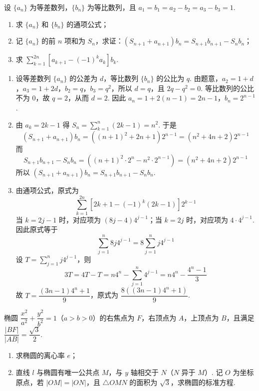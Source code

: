 \begin{problem}
设 \(\{a_n\}\) 为等差数列，\(\{b_n\}\) 为等比数列，且 \(a_1=b_1=a_2-b_2=a_3-b_3=1\).

\begin{enumerate}
\item 求 \(\{a_n\}\) 和 \(\{b_n\}\) 的通项公式；
\item 记 \(\{a_n\}\) 的前 \(n\) 项和为 \(S_n\)，求证：\(\left(S_{n+1}+a_{n+1}\right)b_n=S_{n+1}b_{n+1}-S_nb_n\)；
\item 求 \(\displaystyle\sum_{k=1}^{2n}\left[a_{k+1}-(-1)^ka_k\right]b_k\).
\end{enumerate}
\end{problem}

\begin{solution}
\begin{enumerate}
\item 设等差数列 \(\{a_n\}\) 的公差为 \(d\)，等比数列 \(\{b_n\}\) 的公比为 \(q\). 由题意，\(a_2=1+d\)，\(a_3=1+2d\)，\(b_2=q\)，\(b_3=q^2\)，所以 \(d=q\)，且 \(2q-q^2=0\). 等比数列的公比不为 \(0\)，故 \(q=2\)，从而 \(d=2\). 因此 \(a_n=1+2(n-1)=2n-1\)，\(b_n=2^{n-1}\).
\item 由 \(a_k=2k-1\) 得 \(S_n=\sum_{k=1}^n(2k-1)=n^2\). 于是
\[
(S_{n+1}+a_{n+1})b_n=((n+1)^2+2n+1)2^{n-1}=(n^2+4n+2)2^{n-1}
\]
而
\[
S_{n+1}b_{n+1}-S_nb_n=((n+1)^2\cdot2^n-n^2\cdot2^{n-1})=(n^2+4n+2)2^{n-1}
\]
所以 \((S_{n+1}+a_{n+1})b_n=S_{n+1}b_{n+1}-S_nb_n\).
\item 由通项公式，原式为
\[
\sum_{k=1}^{2n}\left[2k+1-(-1)^k(2k-1)\right]2^{k-1}
\]
当 \(k=2j-1\) 时，对应项为 \((8j-4)4^{j-1}\)；当 \(k=2j\) 时，对应项为 \(4\cdot4^{j-1}\). 因此原式等于
\[
\sum_{j=1}^n8j4^{j-1}=8\sum_{j=1}^n j4^{j-1}
\]
设 \(T=\sum_{j=1}^n j4^{j-1}\)，则
\[
3T=4T-T=n4^n-\sum_{j=1}^n4^{j-1}=n4^n-\dfrac{4^n-1}{3}
\]
故 \(T=\dfrac{(3n-1)4^n+1}{9}\)，原式为 \(\dfrac{8\left((3n-1)4^n+1\right)}{9}\).
\end{enumerate}
\end{solution}

\begin{problem}
椭圆 \(\dfrac{x^2}{a^2}+\dfrac{y^2}{b^2}=1\)（\(a>b>0\)）的右焦点为 \(F\)，右顶点为 \(A\)，上顶点为 \(B\)，且满足 \(\dfrac{|BF|}{|AB|}=\dfrac{\sqrt{3}}{2}\).

\begin{enumerate}
\item 求椭圆的离心率 \(e\)；
\item 直线 \(l\) 与椭圆有唯一公共点 \(M\)，与 \(y\) 轴相交于 \(N\)（\(N\) 异于 \(M\)）. 记 \(O\) 为坐标原点，若 \(|OM|=|ON|\)，且 \(\triangle OMN\) 的面积为 \(\sqrt{3}\)，求椭圆的标准方程.
\end{enumerate}
\end{problem}

